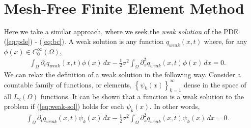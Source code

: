 \documentclass[10pt]{article}
\begin{document}
\section{Mesh-Free Finite Element Method}
Here we take a similar approach, where we seek the \textit{weak
  solution} of the PDE (\ref{eq:pde}) - (\ref{eq:bc}). A weak solution
is any function $q_{weak}(x,t)$ where, for any
$\phi(x) \in C^{\infty}_0(\Omega)$,
\begin{align}
  \displaystyle \int_\Omega \partial_t q_{weak}(x,t) \phi(x)\, dx -
  \frac{1}{2}\sigma^2 \displaystyle \int_\Omega \partial^2_x q_{weak}(x,t) \phi(x)\,dx = 0. \label{eq:weak-sol}
\end{align}
We can relax the definition of a weak solution in the following
way. Consider a countable family of functions, or elements,
$\left\{\psi_k(x)\right\}_{k=1}^\infty$ dense in the space of all
$L_2(\Omega)$ functions. It can be shown that a function is a weak
solution to the problem if (\ref{eq:weak-sol}) holds for each
$\psi_k(x)$. In other words,
\begin{align}
  \displaystyle \int_\Omega \partial_t q_{weak}(x,t) \psi_k(x)\, dx -
  \frac{1}{2}\sigma^2 \displaystyle \int_\Omega \partial^2_x q_{weak}(x,t) \psi_k(x)\,dx = 0. \label{eq:weak-sol-projection}
\end{align}
\end{document}
